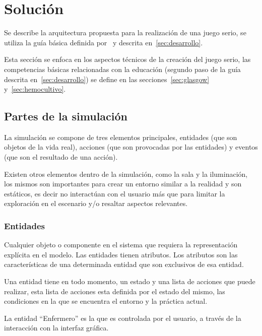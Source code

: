 
\section{Solución}
\label{sec:solucion}


Se describe la arquitectura propuesta para la realización de una juego serio, se
utiliza la guía básica definida por~\cite{pereira2009design} y descrita
en~\ref{sec:desarrollo}.

Esta sección se enfoca en los aspectos técnicos de la creación del juego serio,
las competencias básicas relacionadas con la educación (segundo paso de la guía
descrita en~\ref{sec:desarrollo}) se define en las
secciones~\ref{sec:glasgow} y~\ref{sec:hemocultivo}.

\subsection{Partes de la simulación}

La simulación se compone de tres elementos principales, entidades (que son
objetos de la vida real), acciones (que son provocadas por las entidades) y
eventos (que son el resultado de una acción). 

Existen otros elementos dentro de la simulación, como la sala y la iluminación,
los mismos son importantes para crear un entorno similar a la realidad y son
estáticos, es decir no interactúan con el usuario más que para limitar la
exploración en el escenario y/o resaltar aspectos relevantes.

\subsubsection{Entidades}

Cualquier objeto o componente en el sistema que requiera la representación
explícita en el modelo\cite{banks2000dm}. Las entidades tienen atributos. Los
atributos son las características de una determinada entidad que son exclusivos
de esa entidad.

Una entidad tiene en todo momento, un estado y una lista de acciones que
puede realizar, esta lista de acciones esta definida por el estado del mismo,
las condiciones en la que se encuentra el entorno y la práctica actual.

La entidad \enquote{Enfermero} es la que es controlada por el usuario, a través
de la interacción con la interfaz gráfica.


